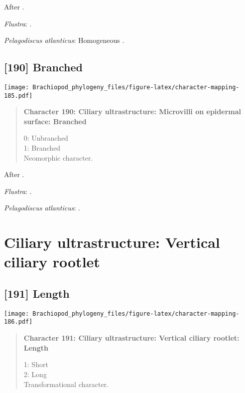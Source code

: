 \documentclass[openany]{book}
\theoremstyle{definition}
\theoremstyle{definition}
\theoremstyle{definition}
\theoremstyle{remark}
\begin{document}
After \citet{Lundin2009}.

\hypertarget{Flustra-coding-189}{}
\emph{Flustra}: \citet{Reed1982}.

\hypertarget{Pelagodiscus_atlanticus-coding-189}{}
\emph{Pelagodiscus atlanticus}: Homogeneous \citep{Luter1995}.

\subsection*{{[}190{]} Branched}\label{branched}

\texttt{[image: Brachiopod\_phylogeny\_files/figure-latex/character-mapping-185.pdf]}

\begin{quote}
\textbf{Character 190: Ciliary ultrastructure: Microvilli on epidermal
surface: Branched}

0: Unbranched\\
1: Branched\\
Neomorphic character.
\end{quote}

After \citet{Lundin2009}.

\hypertarget{Flustra-coding-190}{}
\emph{Flustra}: \citet{Reed1982}.

\hypertarget{Pelagodiscus_atlanticus-coding-190}{}
\emph{Pelagodiscus atlanticus}: \citep{Luter1995}.

\section{Ciliary ultrastructure: Vertical ciliary
rootlet}\label{ciliary-ultrastructure-vertical-ciliary-rootlet}

\subsection*{{[}191{]} Length}\label{length}

\texttt{[image: Brachiopod\_phylogeny\_files/figure-latex/character-mapping-186.pdf]}

\begin{quote}
\textbf{Character 191: Ciliary ultrastructure: Vertical ciliary rootlet:
Length}

1: Short\\
2: Long\\
Transformational character.
\end{quote}
\end{document}
